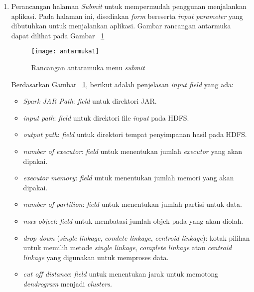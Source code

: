 \begin{enumerate}

\item Perancangan halaman \textit{Submit} untuk mempermudah penggunan menjalankan aplikasi. Pada halaman ini, disediakan \textit{form} bereserta \textit{input parameter} yang dibutuhkan untuk menjalankan aplikasi. Gambar rancangan antarmuka dapat dilihat pada Gambar ~\ref{fig:antarmuka1}

\begin{figure}[H]
    \centering  
    \texttt{[image: antarmuka1]}  
    \caption[Recangan antaramuka menu \textit{submit}]{Rancangan antaramuka menu \textit{submit}} 
    \label{fig:antarmuka1} 
\end{figure}

Berdasarkan Gambar ~\ref{fig:antarmuka1}, berikut adalah penjelasan \textit{input field} yang ada:

\begin{itemize}
\item \textit{Spark JAR Path}: \textit{field} untuk direktori JAR.

\item \textit{input path}: \textit{field} untuk direktori file \textit{input} pada HDFS.

\item \textit{output path}: \textit{field} untuk direktori tempat penyimpanan hasil pada HDFS.

\item \textit{number of executor}: \textit{field} untuk menentukan jumlah \textit{executor} yang akan dipakai.

\item \textit{executor memory}: \textit{field} untuk menentukan jumlah memori yang akan dipakai.

\item \textit{number of partition}: \textit{field} untuk menentukan jumlah partisi untuk data.

\item \textit{max object}: \textit{field} untuk membatasi jumlah objek pada yang akan diolah.

\item \textit{drop down} (\textit{single linkage}, \textit{comlete linkage}, \textit{centroid linkage}): kotak pilihan untuk memilih  metode \textit{single linkage}, \textit{complete linkage} atau \textit{centroid linkage} yang digunakan untuk memproses data.

\item \textit{cut off distance}: \textit{field} untuk menentukan jarak untuk memotong \textit{dendrogram} menjadi \textit{clusters}.


\end{itemize}
\end{enumerate}
